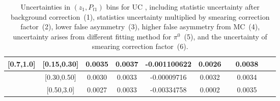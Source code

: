 \begin{table}[H]
\begin{tabular}{|c| c| c| c| c| c| c| c| c| c|}
[0.7,1.0]	&	[0.15,0.30]	&	0.0035	&	0.0037	&	-0.001100622	&	0.0026	&		&	0.0038	\\ \hline
[0.7,1.0]	&	[0.30,0.50]	&	0.0030	&	0.0033	&	-0.00009716	&	0.0032	&		&	0.0034	\\ \hline
[0.7,1.0]	&	[0.50,3.0]	&	0.0027	&	0.0033	&	-0.00334758	&	0.0002	&		&	0.0035	\\ \hline
\end{tabular}
\caption{Uncertainties in $(z_1,P_{t1})$ bins for UC , including statistic uncertainty after background correction~(1), statistics uncertainty multiplied by smearing correction factor~(2), lower false asymmetry~(3), higher false asymmetry from MC~(4), uncertainty arises from different fitting method for $\pi^0$~(5), and the uncertainty of smearing correction factor~(6).}
\label{tab:ucerrors_zpt}
\end{table}


